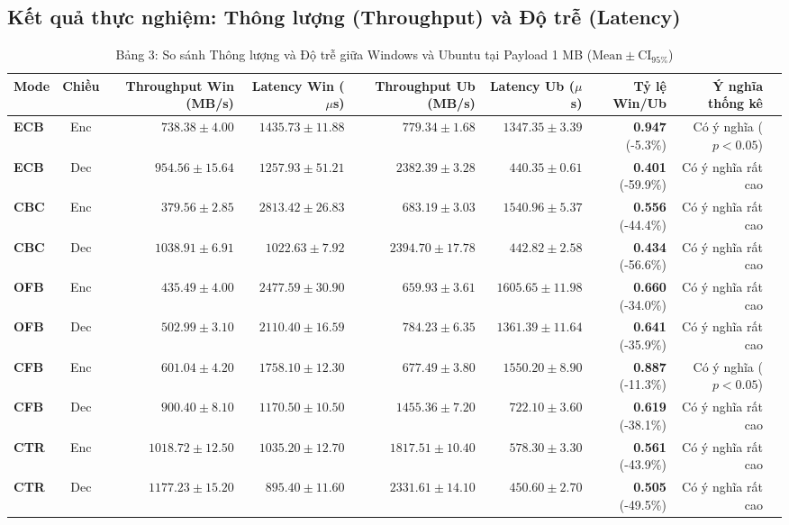 \documentclass[12pt, a4paper]{report}
\begin{document}
\subsection{Kết quả thực nghiệm: Thông lượng (Throughput) và Độ trễ (Latency)}

\begin{table}[H]
\centering
\scriptsize
\caption{Bảng 3: So sánh Thông lượng và Độ trễ giữa Windows và Ubuntu tại Payload 1 MB ($\text{Mean} \pm \text{CI}_{95\%}$)}
\label{tab:bench}
\begin{tabular}{lcrrrrrrc}
\toprule
\textbf{Mode} & \textbf{Chiều} & \textbf{Throughput Win (MB/s)} & \textbf{Latency Win ($\mu$s)} & \textbf{Throughput Ub (MB/s)} & \textbf{Latency Ub ($\mu$s)} & \textbf{Tỷ lệ Win/Ub} & \textbf{Ý nghĩa thống kê} \\
\midrule
\textbf{ECB} & Enc & $738.38 \pm 4.00$ & $1435.73 \pm 11.88$ & $779.34 \pm 1.68$ & $1347.35 \pm 3.39$ & \textbf{0.947} (-5.3\%) & Có ý nghĩa ($p < 0.05$) \\
\textbf{ECB} & Dec & $954.56 \pm 15.64$ & $1257.93 \pm 51.21$ & $2382.39 \pm 3.28$ & $440.35 \pm 0.61$ & \textbf{0.401} (-59.9\%) & Có ý nghĩa rất cao \\
\textbf{CBC} & Enc & $379.56 \pm 2.85$ & $2813.42 \pm 26.83$ & $683.19 \pm 3.03$ & $1540.96 \pm 5.37$ & \textbf{0.556} (-44.4\%) & Có ý nghĩa rất cao \\
\textbf{CBC} & Dec & $1038.91 \pm 6.91$ & $1022.63 \pm 7.92$ & $2394.70 \pm 17.78$ & $442.82 \pm 2.58$ & \textbf{0.434} (-56.6\%) & Có ý nghĩa rất cao \\
\textbf{OFB} & Enc & $435.49 \pm 4.00$ & $2477.59 \pm 30.90$ & $659.93 \pm 3.61$ & $1605.65 \pm 11.98$ & \textbf{0.660} (-34.0\%) & Có ý nghĩa rất cao \\
\textbf{OFB} & Dec & $502.99 \pm 3.10$ & $2110.40 \pm 16.59$ & $784.23 \pm 6.35$ & $1361.39 \pm 11.64$ & \textbf{0.641} (-35.9\%) & Có ý nghĩa rất cao \\
\textbf{CFB} & Enc & $601.04 \pm 4.20$ & $1758.10 \pm 12.30$ & $677.49 \pm 3.80$ & $1550.20 \pm 8.90$ & \textbf{0.887} (-11.3\%) & Có ý nghĩa ($p < 0.05$) \\
\textbf{CFB} & Dec & $900.40 \pm 8.10$ & $1170.50 \pm 10.50$ & $1455.36 \pm 7.20$ & $722.10 \pm 3.60$ & \textbf{0.619} (-38.1\%) & Có ý nghĩa rất cao \\
\textbf{CTR} & Enc & $1018.72 \pm 12.50$ & $1035.20 \pm 12.70$ & $1817.51 \pm 10.40$ & $578.30 \pm 3.30$ & \textbf{0.561} (-43.9\%) & Có ý nghĩa rất cao \\
\textbf{CTR} & Dec & $1177.23 \pm 15.20$ & $895.40 \pm 11.60$ & $2331.61 \pm 14.10$ & $450.60 \pm 2.70$ & \textbf{0.505} (-49.5\%) & Có ý nghĩa rất cao \\

\end{tabular}
\end{table}
\end{document}
